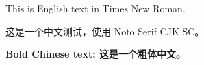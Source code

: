 \documentclass{article}
\begin{document}
This is English text in Times New Roman.

这是一个中文测试，使用 Noto Serif CJK SC。

\textbf{Bold Chinese text: 这是一个粗体中文。}
\end{document}
